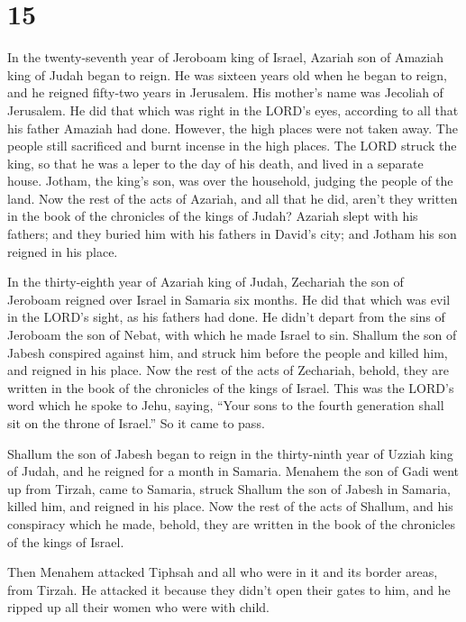 \hypertarget{section-14}{%
\section{15}\label{section-14}}

 In the twenty-seventh year of Jeroboam king of Israel,
Azariah son of Amaziah king of Judah began to reign.  He was
sixteen years old when he began to reign, and he reigned fifty-two years
in Jerusalem. His mother's name was Jecoliah of Jerusalem. 
He did that which was right in the LORD's eyes, according to all that
his father Amaziah had done.  However, the high places were
not taken away. The people still sacrificed and burnt incense in the
high places.  The LORD struck the king, so that he was a
leper to the day of his death, and lived in a separate house. Jotham,
the king's son, was over the household, judging the people of the land.
 Now the rest of the acts of Azariah, and all that he did,
aren't they written in the book of the chronicles of the kings of Judah?
 Azariah slept with his fathers; and they buried him with
his fathers in David's city; and Jotham his son reigned in his place.

 In the thirty-eighth year of Azariah king of Judah,
Zechariah the son of Jeroboam reigned over Israel in Samaria six months.
 He did that which was evil in the LORD's sight, as his
fathers had done. He didn't depart from the sins of Jeroboam the son of
Nebat, with which he made Israel to sin.  Shallum the son
of Jabesh conspired against him, and struck him before the people and
killed him, and reigned in his place.  Now the rest of the
acts of Zechariah, behold, they are written in the book of the
chronicles of the kings of Israel.  This was the LORD's
word which he spoke to Jehu, saying, ``Your sons to the fourth
generation shall sit on the throne of Israel.'' So it came to pass.

 Shallum the son of Jabesh began to reign in the
thirty-ninth year of Uzziah king of Judah, and he reigned for a month in
Samaria.  Menahem the son of Gadi went up from Tirzah, came
to Samaria, struck Shallum the son of Jabesh in Samaria, killed him, and
reigned in his place.  Now the rest of the acts of Shallum,
and his conspiracy which he made, behold, they are written in the book
of the chronicles of the kings of Israel.

 Then Menahem attacked Tiphsah and all who were in it and
its border areas, from Tirzah. He attacked it because they didn't open
their gates to him, and he ripped up all their women who were with
child.

